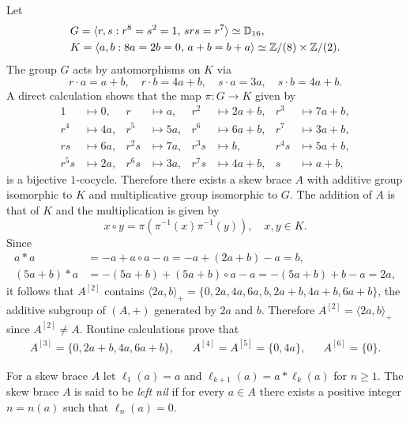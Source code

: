 \begin{example}
    \label{exa:funny}
    Let
    \begin{align*}
        &G=\langle r,s:r^8=s^2=1,\,srs=r^7\rangle\simeq\mathbb{D}_{16},\\
        &K=\langle a,b:8a=2b=0,\,a+b=b+a\rangle\simeq \mathbb{Z}/(8)\times \mathbb{Z}/(2).
    \end{align*}
    The group $G$ acts by automorphisms on $K$ via
    \[
        r\cdot a=a+b,\quad r\cdot b=4a+b,\quad
        s\cdot a=3a, \quad s\cdot b=4a+b.
    \]
    A direct calculation shows that the map $\pi\colon G\to K$  given by
    \begin{align*}
        1 &\mapsto 0, & r&\mapsto a, & r^2&\mapsto 2a+b, & r^3&\mapsto 7a+b,\\
        r^4 &\mapsto 4a, & r^5&\mapsto 5a, & r^6&\mapsto 6a+b, & r^7&\mapsto 3a+b,\\
        rs &\mapsto 6a, & r^2s&\mapsto 7a, & r^3s&\mapsto b, &r^4s&\mapsto 5a+b,\\
        r^5s &\mapsto 2a, & r^6s&\mapsto 3a, &r^7s&\mapsto 4a+b,&s&\mapsto a+b,
    \end{align*}
    is a bijective $1$-cocycle. Therefore there exists a skew brace $A$ with
    additive group isomorphic to $K$ and multiplicative group isomorphic to
    $G$. The addition of $A$ is that of $K$ and the multiplication is given by
    \[
        x\circ y=\pi(\pi^{-1}(x)\pi^{-1}(y)),\quad x,y\in K.
    \]
    Since
    \begin{align*}
        a*a&=-a+a\circ a-a=-a+(2a+b)-a=b,\\
        (5a+b)*a&=-(5a+b)+(5a+b)\circ a-a=-(5a+b)+b-a=2a,
    \end{align*}
    it follows that $A^{[2]}$ contains $\langle
    2a,b\rangle_+=\{0,2a,4a,6a,b,2a+b,4a+b,6a+b\}$, the additive subgroup of
    $(A,+)$ generated by $2a$ and $b$. Therefore $A^{[2]}=\langle 2a,b\rangle_+$
    since $A^{[2]}\ne A$. Routine calculations prove that
    \begin{align*}
        A^{[3]}=\{0,2a+b,4a,6a+b\}, && A^{[4]}=A^{[5]}=\{0,4a\}, && A^{[6]}=\{0\}.
    \end{align*}
\end{example}


\begin{definition}
For a skew brace $A$ let $\ell_1(a)=a$ and $\ell_{k+1}(a)=a*\ell_k(a)$ for
$n\geq1$.  The skew brace $A$ is said to be \emph{left nil} if for every $a\in A$ there
exists a positive integer $n=n(a)$ such that $\ell_n(a)=0$. 
\end{definition}


